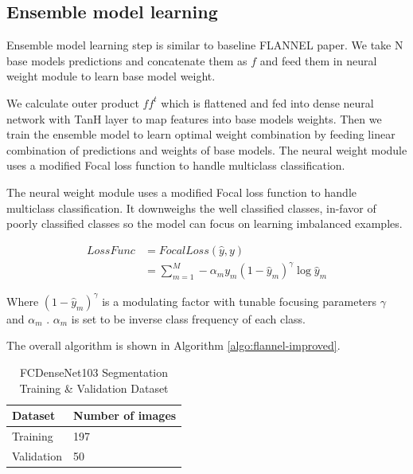 \documentclass{sigkddExp}
\begin{document}
\subsection{Ensemble model learning}
Ensemble model learning step is similar to baseline FLANNEL paper. We take
N base models predictions and concatenate them as $f$ and feed them in neural
weight module to learn base model weight.

We calculate outer product $ff^t$ which is flattened and fed into dense neural
network with TanH layer to map features into base models weights. Then we train
the ensemble model to learn optimal weight combination by feeding linear combination
of predictions and weights of base models. The neural weight module uses a
modified Focal loss function to handle multiclass classification.

The neural weight module uses a modified Focal loss function to handle multiclass
classification. It downweighs the well classified classes, in-favor of
poorly classified classes so the model can focus on learning imbalanced examples.

\begin{align}
    LossFunc & =FocalLoss(\hat{y},y)                                               \\
             & =\sum_{m=1}^{M} - \alpha_m y_m (1-\hat{y}_m)^\gamma \log{\hat{y}_m}
    \label{eq:loss}
\end{align}

Where $(1-\hat{y}_m)^\gamma$ is a modulating factor with tunable focusing
parameters $\gamma$ and $\alpha_m$ \cite{10.1093/jamia/ocaa280}. $\alpha_m$
is set to be inverse class frequency of each class.

The overall algorithm is shown in Algorithm \ref{algo:flannel-improved}.

\begin{table}[h]
    \caption{FC\-DenseNet103 Segmentation Training \& Validation Dataset}
    \label{table:segdata}
    \begin{tabular}{ll} \hline
        Dataset    & Number of images \\ \hline
        Training   & 197              \\
        Validation & 50               \\
        \hline
    \end{tabular}

\end{table}
\end{document}
